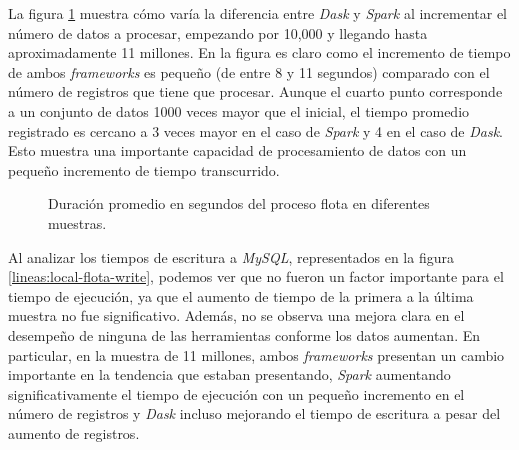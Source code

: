 La figura \ref{lineas:local-flota} muestra cómo varía la diferencia entre \textit{Dask} y \textit{Spark} al incrementar el número de datos a procesar, empezando por 10,000 y llegando hasta aproximadamente 11 millones. En la figura es claro como el incremento de tiempo de ambos \textit{frameworks} es pequeño (de entre 8 y 11 segundos) comparado con el número de registros que tiene que procesar. Aunque el cuarto punto corresponde a un conjunto de datos 1000 veces mayor que el inicial, el tiempo promedio registrado es cercano a 3 veces mayor en el caso de \textit{Spark} y 4 en el caso de \textit{Dask}. Esto muestra una importante capacidad de procesamiento de datos con un pequeño incremento de tiempo transcurrido. 
\begin{figure}
\centering
{}
\caption{Duración promedio en segundos del proceso flota en diferentes muestras.}
\label{lineas:local-flota}
\end{figure}

Al analizar los tiempos de escritura a \textit{MySQL}, representados en la figura \ref{lineas:local-flota-write}, podemos ver que no fueron un factor importante para el tiempo de ejecución, ya que el aumento de tiempo de la primera a la última muestra no fue significativo. Además, no se observa una mejora clara en el desempeño de ninguna de las herramientas conforme los datos aumentan. En particular, en la muestra de 11 millones, ambos \textit{frameworks} presentan un cambio importante en la tendencia que estaban presentando, \textit{Spark} aumentando significativamente el tiempo de ejecución con un pequeño incremento en el número de registros y \textit{Dask} incluso mejorando el tiempo de escritura a pesar del aumento de registros.

